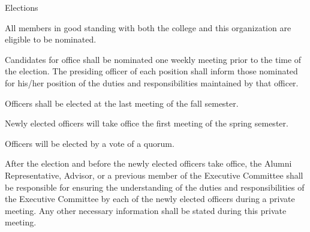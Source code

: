 {
\begin{article}{Elections}
	\item All members in good standing with both the college and this organization are eligible to be nominated.
	\item Candidates for office shall be nominated one weekly meeting prior to the time of the election. The presiding officer of each position shall inform those nominated for his/her position of the duties and responsibilities maintained by that officer.
	\item Officers shall be elected at the last meeting of the fall semester.
	\item Newly elected officers will take office the first meeting of the spring semester.
	\item Officers will be elected by a vote of a quorum.
	\item After the election and before the newly elected officers take office, the Alumni Representative, Advisor, or a previous member of the Executive Committee shall be responsible for ensuring the understanding of the duties and responsibilities of the Executive Committee by each of the newly elected officers during a private meeting. Any other necessary information shall be stated during this private meeting.
\end{article}
}